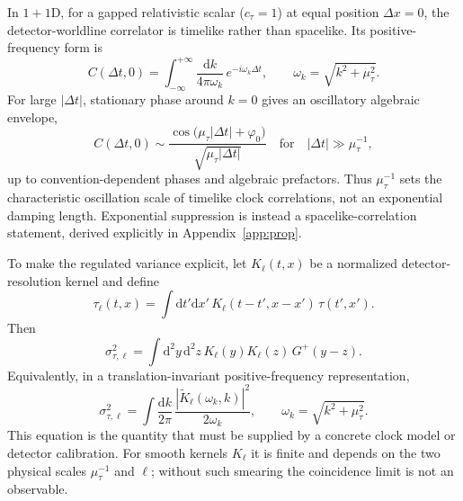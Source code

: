 \documentclass[pdflatex,sn-mathphys-num]{sn-jnl}
\theoremstyle{thmstylethree}
\theoremstyle{thmstyleone}
\theoremstyle{thmstyletwo}
\numberwithin{equation}{section}
\newcommand{\dd}{\mathrm{d}}
\begin{document}
        In $1+1$D, for a gapped relativistic scalar ($c_\tau=1$) at equal position $\Delta x=0$, the detector-worldline correlator is timelike rather than spacelike. Its positive-frequency form is
        \begin{equation}
            C(\Delta t,0)
            =
            \int_{-\infty}^{+\infty}\frac{\dd k}{4\pi\omega_k}\,
            e^{-i\omega_k\Delta t},
            \qquad
            \omega_k=\sqrt{k^2+\mu_\tau^2} .
            \label{eq:timelikeCorrelator}
        \end{equation}
        For large $|\Delta t|$, stationary phase around $k=0$ gives an oscillatory algebraic envelope,
        \begin{equation}
            C(\Delta t,0)
            \sim
            \frac{\cos\!\big(\mu_\tau |\Delta t|+\varphi_0\big)}
            {\sqrt{\mu_\tau |\Delta t|}}
            \quad\text{for}\quad |\Delta t|\gg \mu_\tau^{-1},
            \label{eq:CtimelikeAsymptotic}
        \end{equation}
        up to convention-dependent phases and algebraic prefactors. Thus $\mu_\tau^{-1}$ sets the characteristic oscillation scale of timelike clock correlations, not an exponential damping length. Exponential suppression is instead a spacelike-correlation statement, derived explicitly in Appendix~\ref{app:prop}.
        
        To make the regulated variance explicit, let $K_\ell(t,x)$ be a normalized detector-resolution kernel and define
        \begin{equation}
            \tau_\ell(t,x)
            =
            \int \dd t'\dd x'\,K_\ell(t-t',x-x')\,\tau(t',x') .
            \label{eq:tausmear}
        \end{equation}
        Then
        \begin{equation}
            \sigma_{\tau,\ell}^{2}
            =
            \int \dd^2y\,\dd^2z\,
            K_\ell(y)K_\ell(z)\,G^{+}(y-z) .
            \label{eq:regulatedvariance}
        \end{equation}
        Equivalently, in a translation-invariant positive-frequency representation,
        \begin{equation}
            \sigma_{\tau,\ell}^{2}
            =
            \int\frac{\dd k}{2\pi}\,
            \frac{\left|\widetilde K_\ell(\omega_k,k)\right|^2}{2\omega_k},
            \qquad
            \omega_k=\sqrt{k^2+\mu_\tau^2} .
            \label{eq:regulatedvarianceMomentum}
        \end{equation}
        This equation is the quantity that must be supplied by a concrete clock model or detector calibration. For smooth kernels $K_\ell$ it is finite and depends on the two physical scales $\mu_\tau^{-1}$ and $\ell$; without such smearing the coincidence limit is not an observable.
\end{document}
